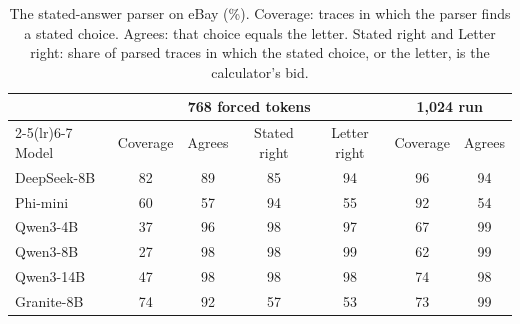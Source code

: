 \begin{table}[h!]
\caption{The stated-answer parser on eBay (\%). Coverage: traces in which the parser finds a stated choice. Agrees: that choice equals the letter. Stated right and Letter right: share of parsed traces in which the stated choice, or the letter, is the calculator's bid.}
\label{tab:stated}
\footnotesize
\centering

\begin{tabular}{lcccccc}
\toprule
& \multicolumn{4}{c}{768 forced tokens} & \multicolumn{2}{c}{1,024 run} \\ \cmidrule(lr){2-5}\cmidrule(lr){6-7} Model & Coverage & Agrees & Stated right & Letter right & Coverage & Agrees \\
\midrule
DeepSeek-8B & 82 & 89 & 85 & 94 & 96 & 94 \\
Phi-mini & 60 & 57 & 94 & 55 & 92 & 54 \\
Qwen3-4B & 37 & 96 & 98 & 97 & 67 & 99 \\
Qwen3-8B & 27 & 98 & 98 & 99 & 62 & 99 \\
Qwen3-14B & 47 & 98 & 98 & 98 & 74 & 98 \\
Granite-8B & 74 & 92 & 57 & 53 & 73 & 99 \\
\bottomrule
\end{tabular}
\end{table}
